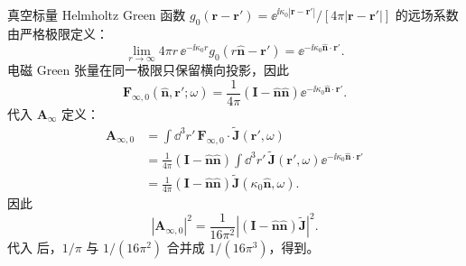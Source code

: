 \begin{derivation}
真空标量 Helmholtz Green 函数
$g_0(\mathbf r-\mathbf r')=\ee^{\ii\kappa_0|\mathbf r-\mathbf r'|}/[4\pi|\mathbf r-\mathbf r'|]$ 的远场系数由严格极限定义：
\begin{equation*}
\lim_{r\to\infty}
4\pi r\,\ee^{-\ii\kappa_0r}
 g_0(r\hat{\mathbf n}-\mathbf r')
=\ee^{-\ii\kappa_0\hat{\mathbf n}\cdot\mathbf r'}.
\end{equation*}
电磁 Green 张量在同一极限只保留横向投影，因此
\[
\mathbf F_{\infty,0}
(\hat{\mathbf n},\mathbf r';\omega)
=\frac1{4\pi}
(\mathbf I-\hat{\mathbf n}\hat{\mathbf n})
\ee^{-\ii\kappa_0\hat{\mathbf n}\cdot\mathbf r'}.
\]
代入 $\mathbf A_\infty$ 定义：
\begin{align*}
\mathbf A_{\infty,0}
&=\int\dd^3 r'\,
\mathbf F_{\infty,0}\cdot\widetilde{\mathbf J}(\mathbf r',\omega)\\
&=\frac1{4\pi}
(\mathbf I-\hat{\mathbf n}\hat{\mathbf n})
\int\dd^3 r'\,\widetilde{\mathbf J}(\mathbf r',\omega)
\ee^{-\ii\kappa_0\hat{\mathbf n}\cdot\mathbf r'}\\
&=\frac1{4\pi}
(\mathbf I-\hat{\mathbf n}\hat{\mathbf n})
\widetilde{\mathbf J}(\kappa_0\hat{\mathbf n},\omega).
\end{align*}
因此
\[
|\mathbf A_{\infty,0}|^2
=\frac1{16\pi^2}
\left|(\mathbf I-\hat{\mathbf n}\hat{\mathbf n})
\widetilde{\mathbf J}\right|^2.
\]
代入 后，$1/\pi$ 与 $1/(16\pi^2)$ 合并成 $1/(16\pi^3)$，得到。
\end{derivation}

